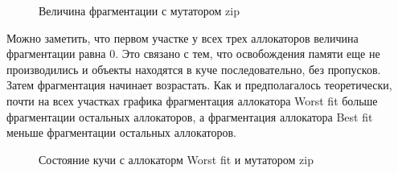    \begin{figure}[h]
   \caption{Величина фрагментации с мутатором zip}
   \label{ris:image}
   \end{figure}
   
   Можно заметить, что первом участке у всех трех аллокаторов величина фрагментации равна 0. Это связано с тем, что освобождения памяти еще не производились и объекты
   находятся в куче последовательно, без пропусков. Затем фрагментация начинает возрастать. Как и предполагалось теоретически, почти на всех участках графика 
   фрагментация аллокатора Worst fit больше фрагментации остальных аллокаторов, а фрагментация аллокатора Best fit меньше фрагментации остальных аллокаторов.
   
   \begin{figure}[p]
   \caption{Состояние кучи с аллокаторм Worst fit и мутатором zip}
   \label{ris:image}
   \end{figure}
   
